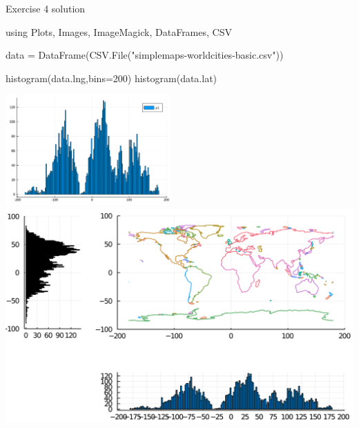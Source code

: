 \documentclass{beamer}
\newenvironment{Boxx}{\begin{tcolorbox}[standard jigsaw, opacityframe=0.8, opacityback=0.0,left=2pt,right=2pt,top=0pt,bottom=0pt]}{\end{tcolorbox}}
\begin{document}
\begin{frame}[fragile]{Exercise 4 solution}


	
\begin{Boxx}
\begin{jllisting}	

	using Plots, Images, ImageMagick, DataFrames, CSV
	
	data = DataFrame(CSV.File("simplemaps-worldcities-basic.csv"))
	
	histogram(data.lng,bins=200)
	histogram(data.lat)
	
	\end{jllisting}
	
	
	
\end{Boxx}		


\centering \includegraphics[width=0.475\textwidth]{images_data/histogram}%
\includegraphics[width=0.475\linewidth]{images_data/plot_final}%


		
\end{frame}
\end{document}
